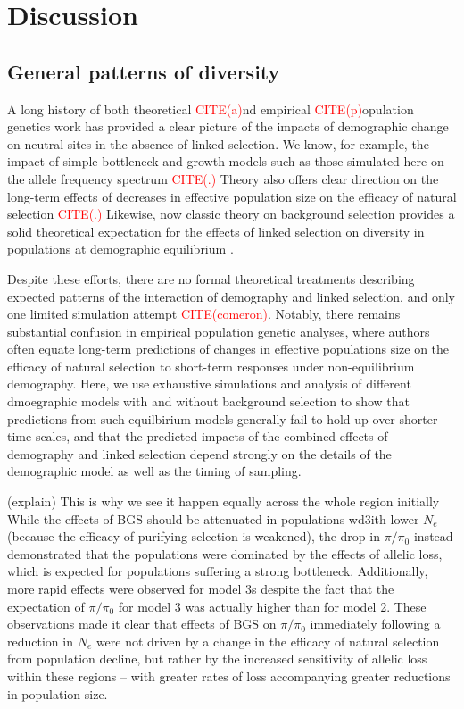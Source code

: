 \documentclass[9pt,twocolumn,twoside]{rilabRxiv}
\newcommand{\citex}[1]{{\small \textcolor{red}{CITE(#1)}}}
\begin{document}
\section{Discussion}

\subsection{General patterns of diversity}

A long history of both theoretical \citex and empirical \citex population genetics work has provided a clear picture of the impacts of demographic change on neutral sites in the absence of linked selection.
We know, for example, the impact of simple bottleneck and growth models such as those simulated here on the allele frequency spectrum \citex.
Theory also offers clear direction on the long-term effects of decreases in effective population size on the efficacy of natural selection \citex.
Likewise, now classic theory on background selection provides a solid theoretical expectation for the effects of linked selection on diversity in populations at demographic equilibrium \citep{inordborg1996effect}.

Despite these efforts, there are no formal theoretical treatments describing expected patterns of the interaction of demography and linked selection, and only one limited simulation attempt \citex{comeron}.
Notably, there remains substantial confusion in empirical population genetic analyses, where authors often equate long-term predictions of changes in effective populations size on the efficacy of natural selection to short-term responses under non-equilibrium demography.
Here, we use exhaustive simulations and analysis of different dmoegraphic models with and without background selection to show that predictions from such equilbirium models generally fail to hold up over shorter time scales, and that the predicted impacts of the combined effects of demography and linked selection depend strongly on the details of the demographic model as well as the timing of sampling.

(explain)
This is why we see it happen equally across the whole region initially 
While the effects of BGS should be attenuated in populations wd3ith lower $N_e$ (because the efficacy of purifying selection is weakened), the drop in $\pi/\pi_0$ instead demonstrated that the populations were dominated by the effects of allelic loss, which is expected for populations suffering a strong bottleneck.
Additionally, more rapid effects were observed for model 3s despite the fact that the expectation of $\pi/\pi_0$ for model 3 was actually higher than for model 2.
These observations made it clear that effects of BGS on $\pi/\pi_0$ immediately following a reduction in $N_e$ were not driven by a change in the efficacy of natural selection from population decline, but rather by the increased sensitivity of allelic loss within these regions -- with greater rates of loss accompanying greater reductions in population size.
\end{document}

